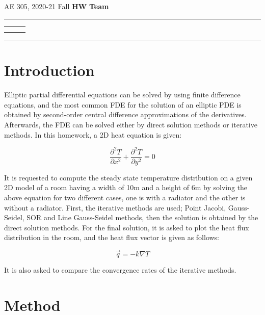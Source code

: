 \documentclass[letterpaper,12pt]{article}
\begin{document}
\begin{center}
AE 305, 2020-21 Fall \hfill \textbf{HW \HWno} \hfill \textbf{Team \TeamNo} \\
\noindent\rule{\textwidth}{0.4pt}
\begin{tabular}{p{} | p{} | p{} }
	\AuthorOneName&\AuthorTwoName&\AuthorThreeName\\
	\textit{\AuthorOneID}&\textit{\AuthorTwoID}&\textit{\AuthorThreeID}
\end{tabular}
\noindent\rule{\textwidth}{0.4pt}
\end{center}


\section{Introduction}
Elliptic partial differential equations can be solved by using finite difference equations,
and the most common FDE for the solution of an elliptic PDE is obtained by second-order
central difference approximations of the derivatives. Afterwards, the FDE can
be solved either by direct solution methods or iterative methods. In this homework, a 2D
heat equation is given:

\begin{equation}
	\frac{\partial^2T}{\partial x^2} + \frac{\partial^2T}{\partial y^2} = 0
	\label{eqn:heateqn}
\end{equation}

It is requested to compute the steady state temperature distribution on a given 2D model
of a room having a width of 10m and a height of 6m by solving the above equation for 
two different cases, one is with a radiator and the other is without a radiator. First,
the iterative methods are used; Point Jacobi, Gauss-Seidel, SOR and Line Gauss-Seidel
methods, then the solution is obtained by the direct solution methods. For the final
solution, it is asked to plot the heat flux distribution in the room, and the heat flux
vector is given as follows:

\begin{equation}
	\vec{q} = -k \nabla T
	\label{eqn:heatflux}
\end{equation}

It is also asked to compare the convergence rates of the iterative methods.
\section{Method}
\end{document}
